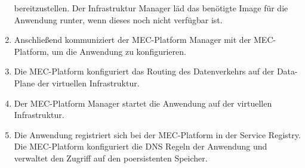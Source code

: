 \documentclass[runningheads]{llncs}
\numberwithin{figure}{section}
\begin{document}
\begin{enumerate}
  bereitzustellen. Der Infrastruktur Manager läd das benötigte Image für die Anwendung runter, wenn dieses noch nicht verfügbar ist.
  \item Anschließend kommuniziert der MEC-Platform Manager mit der MEC-Platform, um die Anwendung zu konfigurieren.
  \item Die MEC-Platform konfiguriert das Routing des Datenverkehrs auf der Data-Plane der virtuellen Infrastruktur.
  \item Der MEC-Platform Manager startet die Anwendung auf der virtuellen Infrastruktur.
  \item Die Anwendung registriert sich bei der MEC-Platform in der Service Registry. Die MEC-Platform konfiguriert die DNS Regeln der 
  Anwendung und verwaltet den Zugriff auf den poersistenten Speicher.
\end{enumerate}

\newpage
\end{document}

